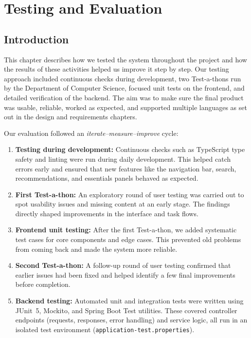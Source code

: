 \cleardoublepage
\chapter{Testing and Evaluation}

\section{Introduction}

This chapter describes how we tested the system throughout the project and how the results of these
activities helped us improve it step by step. Our testing approach included continuous checks during
development, two Test-a-thons run by the Department of Computer Science, focused unit tests on the
frontend, and detailed verification of the backend. The aim was to make sure the final product was usable,
reliable, worked as expected, and supported multiple languages as set out in the design and requirements
chapters.

Our evaluation followed an \emph{iterate--measure--improve} cycle:
\begin{enumerate}
    \item \textbf{Testing during development:} Continuous checks such as TypeScript type safety and linting were run during daily development. This helped catch errors early and ensured that new features like the navigation bar, search, recommendations, and essentials panels behaved as expected.
    \item \textbf{First Test-a-thon:} An exploratory round of user testing was carried out to spot usability issues and missing content at an early stage. The findings directly shaped improvements in the interface and task flows.
    \item \textbf{Frontend unit testing:} After the first Test-a-thon, we added systematic test cases for core components and edge cases. This prevented old problems from coming back and made the system more reliable.
    \item \textbf{Second Test-a-thon:} A follow-up round of user testing confirmed that earlier issues had been fixed and helped identify a few final improvements before completion.
    \item \textbf{Backend testing:} Automated unit and integration tests were written using JUnit~5, Mockito, and Spring Boot Test utilities. These covered controller endpoints (requests, responses, error handling) and service logic, all run in an isolated test environment (\texttt{application-test.properties}).
\end{enumerate}

